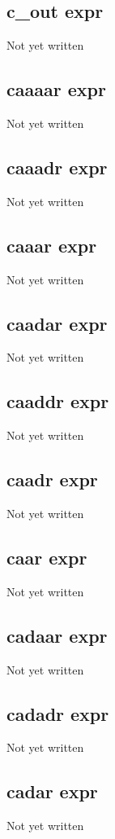 \documentclass[a4paper,11pt]{article}
\begin{document}
{\subsection{\ttfamily c\_out expr}
   Not yet written

\subsection{\ttfamily caaaar expr}
   Not yet written

\subsection{\ttfamily caaadr expr}
   Not yet written

\subsection{\ttfamily caaar expr}
   Not yet written

\subsection{\ttfamily caadar expr}
   Not yet written

\subsection{\ttfamily caaddr expr}
   Not yet written

\subsection{\ttfamily caadr expr}
   Not yet written

\subsection{\ttfamily caar expr}
   Not yet written

\subsection{\ttfamily cadaar expr}
   Not yet written

\subsection{\ttfamily cadadr expr}
   Not yet written

\subsection{\ttfamily cadar expr}
   Not yet written

}
\end{document}
